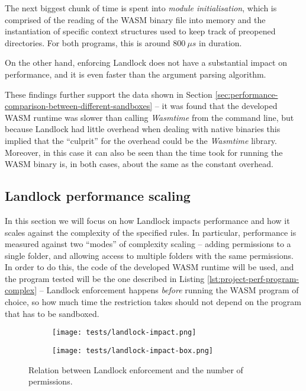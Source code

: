 The next biggest chunk of time is spent into \textit{module initialisation}, which is comprised of the
reading of the WASM binary file into memory and the instantiation of specific context structures used
to keep track of preopened directories. For both programs, this is around $800\ \mu s$ in duration.

On the other hand, enforcing Landlock does not have a substantial impact on performance,
and it is even faster than the argument parsing algorithm.

These findings further support the data shown in Section \ref{sec:performance-comparison-between-different-sandboxes} --
it was found that the developed WASM runtime was slower than calling \textit{Wasmtime} from the command
line, but because Landlock had little overhead when dealing with native binaries this implied that
the ``culprit'' for the overhead could be the \textit{Wasmtime} library.
Moreover, in this case it can also be seen than the time took for running the WASM binary is, in both cases, about
the same as the constant overhead.

\clearpage
\subsection{Landlock performance scaling}
\label{sec:performance-internal-analysis-landlock-impact}

In this section we will focus on how Landlock impacts performance and how it scales
against the complexity of the specified rules. In particular, performance is measured against
two ``modes'' of complexity scaling -- adding permissions to a single folder, and allowing access to multiple folders
with the same permissions.
In order to do this, the code of the developed WASM runtime will be used, and
the program tested will be the one described in Listing \ref{lst:project-perf-program-complex} -- Landlock enforcement
happens \textit{before} running the WASM program of choice, so how much time the restriction takes should not
depend on the program that has to be sandboxed.

\begin{figure}[hbt!]
  \centering
  \begin{subfigure}[b]{0.49\textwidth}
    \texttt{[image: tests/landlock-impact.png]}
  \end{subfigure}
  \begin{subfigure}[b]{0.49\textwidth}
    \texttt{[image: tests/landlock-impact-box.png]}
  \end{subfigure}

  \caption{Relation between Landlock enforcement and the number of permissions.}
  \label{fig:perf-test-landlock-impact-permissions}
\end{figure}

